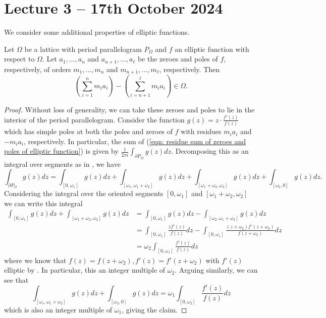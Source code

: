 \section{Lecture 3 -- 17th October 2024}\label{sec: lecture 3}
We consider some additional properties of elliptic functions. 
\begin{proposition}\label{prop: sum of residues of elliptic functions}
    Let $\Omega$ be a lattice with period parallelogram $P_{\Omega}$ and $f$ an elliptic function with respect to $\Omega$. Let $a_{1},\dots,a_{n}$ and $a_{n+1},\dots,a_{\ell}$ be the zeroes and poles of $f$, respectively, of orders $m_{1},\dots,m_{n}$ and $m_{n+1},\dots,m_{\ell}$, respectively. Then 
    \begin{equation}\label{eqn: residue sum of zeroes and poles of elliptic function}
        \left(\sum_{i=1}^{n}m_{i}a_{i}\right)-\left(\sum_{i=n+1}^{\ell}m_{i}a_{i}\right)\in\Omega.
    \end{equation}
\end{proposition}
\begin{proof}
    Without loss of generality, we can take these zeroes and poles to lie in the interior of the period parallelogram. Consider the function $g(z)=z\cdot\frac{f'(z)}{f(z)}$ which has simple poles at both the poles and zeroes of $f$ with residues $m_{i}a_{i}$ and $-m_{i}a_{i}$, respectively. In particular, the sum of (\ref{eqn: residue sum of zeroes and poles of elliptic function}) is given by $\frac{1}{2\pi i}\int_{\partial P_{\Omega}}g(z)dz$. Decomposing this as an integral over segments as in , we have 
    $$\int_{\partial P_{\Omega}}g(z)dz = \int_{[0,\omega_{1}]}g(z)dz + \int_{[\omega_{1},\omega_{1}+\omega_{2}]}g(z)dz + \int_{[\omega_{1}+\omega_{2},\omega_{2}]}g(z)dz+\int_{[\omega_{2},0]}g(z)dz.$$
    Considering the integral over the oriented segments $[0,\omega_{1}]$ and $[\omega_{1}+\omega_{2},\omega_{2}]$ we can write this integral 
    \begin{align*}
        \int_{[0,\omega_{1}]}g(z)dz + \int_{[\omega_{1}+\omega_{2},\omega_{2}]}g(z)dz &= \int_{[0,\omega_{1}]}g(z)dz - \int_{[\omega_{2},\omega_{1}+\omega_{2}]}g(z)dz \\ 
        &= \int_{[0,\omega_{1}]}\frac{zf'(z)}{f(z)}dz - \int_{[0,\omega_{1}]}\frac{(z+\omega_{2})f'(z+\omega_{2})}{f(z+\omega_{2})}dz \\
        &= \omega_{2}\int_{[0,\omega_{1}]}\frac{f'(z)}{f(z)}dz
    \end{align*}
    where we know that $f(z)=f(z+\omega_{2}), f'(z)=f'(z+\omega_{2})$ with $f'(z)$ elliptic by . In particular, this an integer multiple of $\omega_{2}$. Arguing similarly, we can see that 
    $$\int_{[\omega_{1},\omega_{1}+\omega_{2}]}g(z)dz + \int_{[\omega_{2},0]}g(z)dz = \omega_{1}\int_{[0,\omega_{2}]}\frac{f'(z)}{f(z)}dz$$
    which is also an integer multiple of $\omega_{1}$, giving the claim.  
\end{proof}

